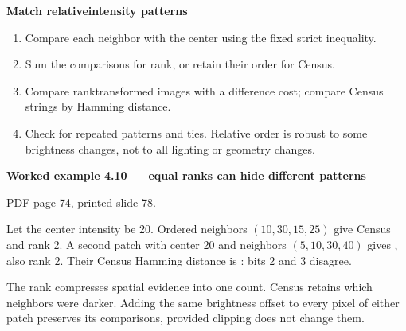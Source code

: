 \documentclass[letterpaper,11pt,english,openany,oneside]{jupyterBook}
\begin{document}
\begin{TextbookBox}
\textbf{Match relative\sphinxhyphen{}intensity patterns}\par\smallskip
\begin{enumerate}
%
\item {}
\sphinxAtStartPar
Compare each neighbor with the center using the fixed strict inequality.

\item {}
\sphinxAtStartPar
Sum the comparisons for rank, or retain their order for Census.

\item {}
\sphinxAtStartPar
Compare rank\sphinxhyphen{}transformed images with a difference cost; compare Census strings by Hamming distance.

\item {}
\sphinxAtStartPar
Check for repeated patterns and ties. Relative order is robust to some brightness changes, not to all lighting or geometry changes.

\end{enumerate}

\end{TextbookBox}
\label{\detokenize{lectures/lecture04/matching:ex-lec04-census}}
\begin{TextbookBox}
\textbf{Worked example 4.10 — equal ranks can hide different patterns}\par\smallskip

\sphinxAtStartPar
{} PDF page 74, printed slide 78.

\sphinxAtStartPar
Let the center intensity be 20. Ordered neighbors \((10,30,15,25)\) give Census  and rank 2. A second patch with center 20 and neighbors \((5,10,30,40)\) gives , also rank 2. Their Census Hamming distance is : bits 2 and 3 disagree.

\sphinxAtStartPar
The rank compresses spatial evidence into one count. Census retains which neighbors were darker. Adding the same brightness offset to every pixel of either patch preserves its comparisons, provided clipping does not change them.

\end{TextbookBox}
\end{document}
